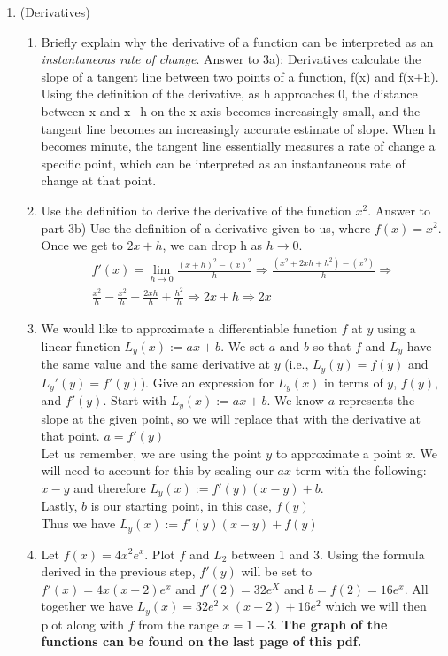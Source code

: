 \documentclass[12pt,twoside]{article}
\begin{document}
\begin{enumerate}
\item (Derivatives)
  \begin{enumerate}
  \item Briefly explain why the derivative of a function can be interpreted as an \emph{instantaneous rate of change}.
  \subitem Answer to 3a): Derivatives calculate the slope of a tangent line between two points of a function, f(x) and f(x+h). Using the definition of the derivative, as h approaches 0, the distance between x and x+h on the x-axis becomes increasingly small, and the tangent line becomes an increasingly accurate estimate of slope. When h becomes minute, the tangent line essentially measures a rate of change a specific point, which can be interpreted as an instantaneous rate of change at that point.
  \item Use the definition to derive the derivative of the function $x^2$.
  \subitem Answer to part 3b) Use the definition of a derivative given to us, where $f(x)=x^2$. Once we get to $2x+h$, we can drop h as $h\rightarrow 0$.
  \begin{align}
    f'(x)= \lim_{h \rightarrow 0} \frac{(x+h)^2 - (x)^2}{h} \Longrightarrow \frac{(x^2+2xh+h^2)-(x^2)}{h} \Longrightarrow 
    \\ \frac{x^2}{h} - \frac{x^2}{h}+ \frac{2xh}{h} + \frac{h^2}{h} \Longrightarrow 2x+h \Longrightarrow 2x
    \end{align}
  \item We would like to approximate a differentiable function $f$ at
    $y$ using a linear function $L_y(x):=ax + b$. We set $a$ and $b$
    so that $f$ and $L_y$ have the same value and the same derivative
    at $y$ (i.e., $L_y(y)=f(y)$ and $L_y'(y)=f'(y)$). Give an
    expression for $L_{y}(x)$ in terms of $y$, $f(y)$, and $f'(y)$.  
\subitem
Start with $L_y(x):=ax + b$. We know $a$ represents the slope at the given point, so we will replace that with the derivative at that point.
$a=f'(y)$\\
Let us remember, we are using the point $y$ to approximate a point $x$. We will need to account for this by scaling our $ax$ term with the following:  $x-y$ and therefore $L_y(x):= f'(y)(x-y) + b$. \\
Lastly, $b$ is our starting point, in this case, $f(y)$\\
Thus we have $L_y(x):=f'(y)(x-y) + f(y)$
  \item Let $f(x) = 4x^2 e^{x}$. Plot $f$ and $L_{2}$ between 1 and 3. 
  \subitem
  Using the formula derived in the previous step, $f'(y)$ will be set to $f'(x) = 4x(x+2)e^x$ and $f'(2) = 32e^X$ and $b =f(2) = 16e^x $. All together we have $L_y(x) = 32e^2 \times (x-2) + 16e^2$ which we will then plot along with $f$ from the range $x=1-3$.\textbf{ The graph of the functions can be found on the last page of this pdf.}
  \end{enumerate}
  

\end{enumerate}
\end{document}
